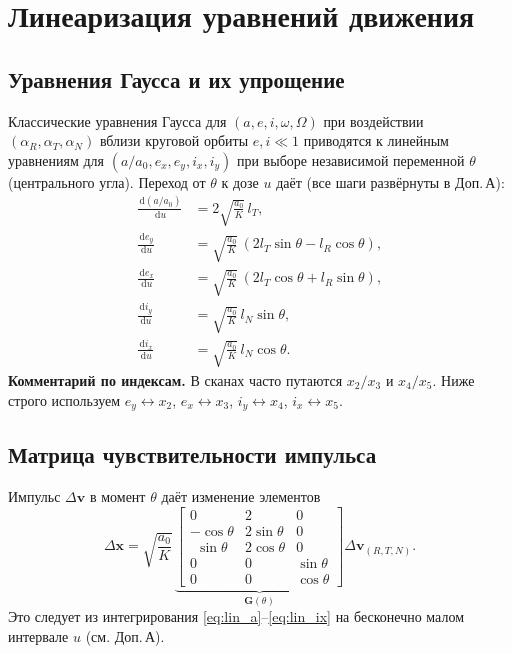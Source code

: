 \documentclass[12pt,a4paper]{article}
\newcommand{\dd}{\,\mathrm{d}}
\newcommand{\vv}[1]{\bm{#1}}
\begin{document}
\section{Линеаризация уравнений движения}

\subsection{Уравнения Гаусса и их упрощение}
Классические уравнения Гаусса для $(a,e,i,\omega,\Omega)$ при воздействии $(\alpha_R,\alpha_T,\alpha_N)$ вблизи круговой орбиты $e,i\ll1$ приводятся к линейным уравнениям для $(a/a_0,e_x,e_y,i_x,i_y)$ при выборе независимой переменной $\theta$ (центрального угла).
Переход от $\theta$ к дозе $u$ даёт (все шаги развёрнуты в Доп.\,А):
\begin{align}
\frac{\dd (a/a_0)}{\dd u} &= 2\sqrt{\frac{a_0}{K}}\,l_T, \label{eq:lin_a}\\
\frac{\dd e_y}{\dd u} &= \sqrt{\frac{a_0}{K}}\,(2l_T\sin\theta - l_R\cos\theta),\label{eq:lin_ey}\\
\frac{\dd e_x}{\dd u} &= \sqrt{\frac{a_0}{K}}\,(2l_T\cos\theta + l_R\sin\theta),\label{eq:lin_ex}\\
\frac{\dd i_y}{\dd u} &= \sqrt{\frac{a_0}{K}}\,l_N\sin\theta,\label{eq:lin_iy}\\
\frac{\dd i_x}{\dd u} &= \sqrt{\frac{a_0}{K}}\,l_N\cos\theta.\label{eq:lin_ix}
\end{align}
\textbf{Комментарий по индексам.} В сканах часто путаются $x_2/x_3$ и $x_4/x_5$. Ниже строго используем
$e_y\leftrightarrow x_2$, $e_x\leftrightarrow x_3$, $i_y\leftrightarrow x_4$, $i_x\leftrightarrow x_5$.

\subsection{Матрица чувствительности импульса}
Импульс $\Delta\vv v$ в момент $\theta$ даёт изменение элементов
\begin{equation}\label{eq:Gmap}
\Delta\vv x = \sqrt{\frac{a_0}{K}}\,
\underbrace{\begin{bmatrix}
0 & 2 & 0\\
-\cos\theta & 2\sin\theta & 0\\
\ \ \sin\theta & 2\cos\theta & 0\\
0 & 0 & \sin\theta\\
0 & 0 & \cos\theta
\end{bmatrix}}_{\displaystyle \mathbf{G}(\theta)}
\Delta\vv v_{(R,T,N)}.
\end{equation}
Это следует из интегрирования \eqref{eq:lin_a}--\eqref{eq:lin_ix} на бесконечно малом интервале $u$ (см. Доп.\,А).
\end{document}
